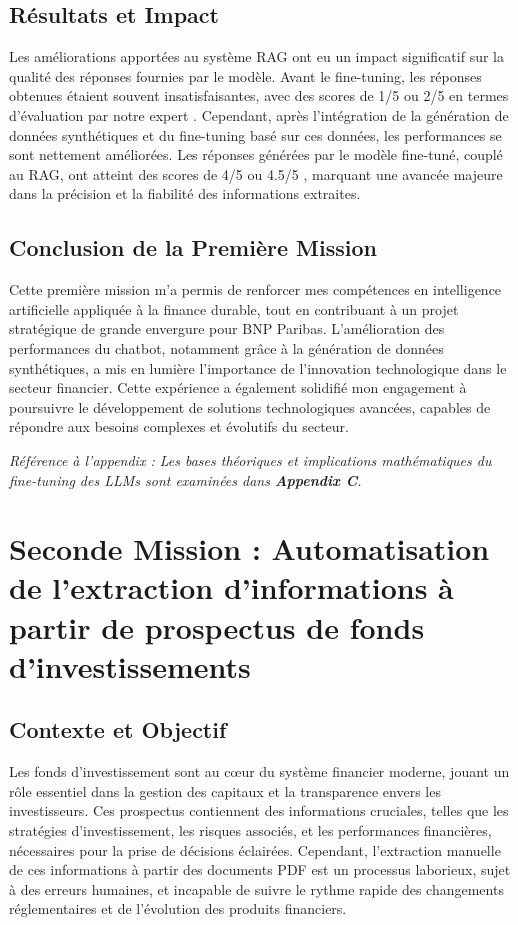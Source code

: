 \documentclass[13pt,a4paper]{article}
\begin{document}
\subsection{Résultats et Impact}

Les améliorations apportées au système RAG ont eu un impact significatif sur la qualité des réponses fournies par le modèle. Avant le fine-tuning, les réponses obtenues étaient souvent insatisfaisantes, avec des scores de 1/5 ou 2/5 en termes d'évaluation par notre expert . Cependant, après l'intégration de la génération de données synthétiques et du fine-tuning basé sur ces données, les performances se sont nettement améliorées. Les réponses générées par le modèle fine-tuné, couplé au RAG, ont atteint des scores de 4/5 ou 4.5/5 , marquant une avancée majeure dans la précision et la fiabilité des informations extraites.

\subsection{Conclusion de la Première Mission}

Cette première mission m'a permis de renforcer mes compétences en intelligence artificielle appliquée à la finance durable, tout en contribuant à un projet stratégique de grande envergure pour BNP Paribas. L'amélioration des performances du chatbot, notamment grâce à la génération de données synthétiques, a mis en lumière l'importance de l'innovation technologique dans le secteur financier. Cette expérience a également solidifié mon engagement à poursuivre le développement de solutions technologiques avancées, capables de répondre aux besoins complexes et évolutifs du secteur.

\textit{Référence à l'appendix : Les bases théoriques et implications mathématiques du \textit{fine-tuning} des LLMs sont examinées dans \textbf{Appendix C}.}

\newpage

\section{\Large \bf Seconde Mission : Automatisation de l'extraction d'informations à partir de prospectus de fonds d'investissements}

\subsection{Contexte et Objectif}

Les fonds d'investissement sont au cœur du système financier moderne, jouant un rôle essentiel dans la gestion des capitaux et la transparence envers les investisseurs. Ces prospectus contiennent des informations cruciales, telles que les stratégies d'investissement, les risques associés, et les performances financières, nécessaires pour la prise de décisions éclairées. Cependant, l'extraction manuelle de ces informations à partir des documents PDF est un processus laborieux, sujet à des erreurs humaines, et incapable de suivre le rythme rapide des changements réglementaires et de l'évolution des produits financiers.
\end{document}
